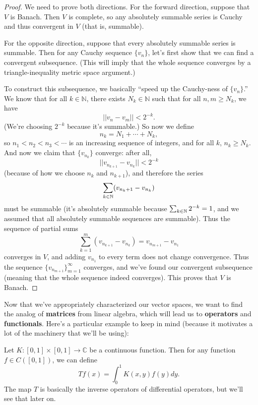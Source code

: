 \begin{proof}
We need to prove both directions. For the forward direction, suppose that $V$ is Banach. Then $V$ is complete, so any absolutely summable series is Cauchy and thus convergent in $V$ (that is, summable). 

For the opposite direction, suppose that every absolutely summable series is summable. Then for any Cauchy sequence $\{v_n\}$, let's first show that we can find a convergent subsequence. (This will imply that the whole sequence converges by a triangle-inequality metric space argument.)

To construct this subsequence, we basically ``speed up the Cauchy-ness of $\{v_n\}$.'' We know that for all $k \in \mathbb{N}$, there exists $N_k \in \mathbb{N}$ such that for all $n, m \ge N_k$, we have 
\[
    ||v_n - v_m|| < 2^{-k}.
\]
(We're choosing $2^{-k}$ because it's summable.) So now we define 
\[
    n_k = N_1 + \cdots + N_k,
\]
so $n_1 < n_2 < n_3 < \cdots$ is an increasing sequence of integers, and for all $k$, $n_k \ge N_k$. And now we claim that $\{v_{n_k}\}$ converge: after all, 
\[
    ||v_{n_{k+1}} - v_{n_k}|| < 2^{-k} 
\]
(because of how we choose $n_k$ and $n_{k+1}$),  and therefore the series
\[
    \sum_{k \in \mathbb N} (v_{n_k+1} - v_{n_k})
\]
must be summable (it's absolutely summable because $\sum_{k \in \mathbb N} 2^{-k} = 1$, and we assumed that all absolutely summable sequences are summable). Thus the sequence of partial sums 
\[
    \sum_{k=1}^m (v_{n_{k+1}} - v_{n_k}) = v_{n_{m+1}} - v_{n_1}
\]
converges in $V$, and adding $v_{n_1}$ to every term does not change convergence. Thus the sequence $\{v_{n_{m+1}}\}_{m=1}^{\infty}$ converges, and we've found our convergent subsequence (meaning that the whole sequence indeed converges). This proves that $V$ is Banach. 
\end{proof}

Now that we've appropriately characterized our vector spaces, we want to find the analog of \textbf{matrices} from linear algebra, which will lead us to \textbf{operators} and \textbf{functionals}. Here's a particular example to keep in mind (because it motivates a lot of the machinery that we'll be using):

\begin{example}\label{firstlinop}
Let $K: [0, 1] \times [0, 1] \to \mathbb{C}$ be a continuous function. Then for any function $f \in C([0, 1])$, we can define 
\[
    Tf(x) = \int_0^1 K(x, y) f(y) dy.
\]
The map $T$ is basically the inverse operators of differential operators, but we'll see that later on.
\end{example}

